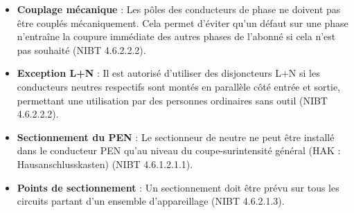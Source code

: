 \documentclass[a4paper,11pt,answers,addpoints]{exam}
\begin{document}
\begin{questions}
\begin{solution}
	\begin{itemize}
		\item \textbf{Couplage mécanique} : Les pôles des conducteurs de phase ne doivent pas être couplés mécaniquement. Cela permet d'éviter qu'un défaut sur une phase n'entraîne la coupure immédiate des autres phases de l'abonné si cela n'est pas souhaité (NIBT 4.6.2.2.2).
		\item \textbf{Exception L+N} : Il est autorisé d'utiliser des disjoncteurs L+N si les conducteurs neutres respectifs sont montés en parallèle côté entrée et sortie, permettant une utilisation par des personnes ordinaires sans outil (NIBT 4.6.2.2.2).
		\item \textbf{Sectionnement du PEN} : Le sectionneur de neutre ne peut être installé dans le conducteur PEN qu'au niveau du coupe-surintensité général (HAK : Hausanschlusskasten) (NIBT 4.6.1.2.1.1).
		\item \textbf{Points de sectionnement} : Un sectionnement doit être prévu sur tous les circuits partant d'un ensemble d'appareillage (NIBT 4.6.2.1.3).
	\end{itemize}
\end{solution}
\end{questions}
\end{document}
